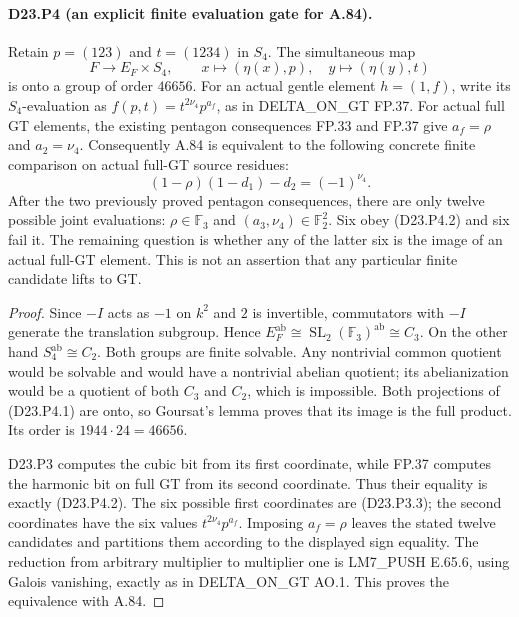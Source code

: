 \paragraph{D23.P4 (an explicit finite evaluation gate for A.84).}
Retain $p=(123)$ and $t=(1234)$ in $S_4$. The simultaneous map
\[
 F\longrightarrow E_F\times S_4,\qquad
 x\longmapsto(\eta(x),p),\quad
 y\longmapsto(\eta(y),t)
 \tag{D23.P4.1}
\]
is onto a group of order $46656$. For an actual gentle element
$h=(1,f)$, write its $S_4$-evaluation as
$f(p,t)=t^{2\nu_4}p^{a_f}$, as in DELTA\_ON\_GT FP.37.
For actual full GT elements, the existing pentagon consequences
FP.33 and FP.37 give $a_f=\rho$ and $a_2=\nu_4$.
Consequently A.84 is equivalent to the following concrete finite
comparison on actual full-GT source residues:
\[
 \boxed{\quad
 (1-\rho)(1-d_1)-d_2=(-1)^{\nu_4}.
 \quad} \tag{D23.P4.2}
\]
After the two previously proved pentagon consequences, there are
only twelve possible joint evaluations: $\rho\in\mathbb F_3$
and $(a_3,\nu_4)\in\mathbb F_2^2$. Six obey (D23.P4.2) and
six fail it. The remaining question is whether any of the latter
six is the image of an actual full-GT element. This is not an
assertion that any particular finite candidate lifts to GT.

\begin{proof}
Since $-I$ acts as $-1$ on $k^2$ and $2$ is invertible, commutators
with $-I$ generate the translation subgroup. Hence
$E_F^{\mathrm{ab}}\cong\operatorname{SL}_2(\mathbb F_3)^{\mathrm{ab}}
\cong C_3$. On the other hand $S_4^{\mathrm{ab}}\cong C_2$.
Both groups are finite solvable. Any nontrivial common quotient
would be solvable and would have a nontrivial abelian quotient;
its abelianization would be a quotient of both $C_3$ and $C_2$,
which is impossible. Both projections of (D23.P4.1) are onto,
so Goursat's lemma proves that its image is the full product.
Its order is $1944\cdot24=46656$.

D23.P3 computes the cubic bit from its first coordinate, while
FP.37 computes the harmonic bit on full GT from its second
coordinate. Thus their equality is exactly (D23.P4.2).
The six possible first coordinates are (D23.P3.3); the second
coordinates have the six values $t^{2\nu_4}p^{a_f}$.
Imposing $a_f=\rho$ leaves the stated twelve candidates and
partitions them according to the displayed sign equality.
The reduction from arbitrary multiplier to multiplier one is
LM7\_PUSH E.65.6, using Galois vanishing, exactly as in
DELTA\_ON\_GT AO.1. This proves the equivalence with A.84.
\end{proof}
